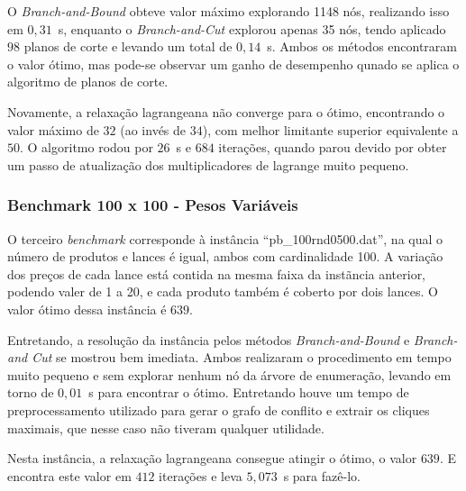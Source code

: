 \documentclass{article}
\begin{document}
    O \emph{Branch-and-Bound} obteve valor máximo explorando 1148 nós, realizando isso em $0{,}31$~s, enquanto o \emph{Branch-and-Cut} explorou apenas 35 nós, tendo aplicado $98$ planos de corte e levando um total de $0{,}14$~s. Ambos os métodos encontraram o valor ótimo, mas pode-se observar um ganho de desempenho qunado se aplica o algoritmo de planos de corte.
    
    Novamente, a relaxação lagrangeana não converge para o ótimo, encontrando o valor máximo de $32$ (ao invés de $34$), com melhor limitante superior equivalente a $50$. O algoritmo rodou por $26$~s e $684$ iterações, quando parou devido por obter um passo de atualização dos multiplicadores de lagrange muito pequeno.
    
    
    \subsubsection{Benchmark 100 x 100 - Pesos Variáveis}
    O terceiro \emph{benchmark} corresponde à instância \enquote{pb\_100rnd0500.dat}, na qual o número de produtos e lances é igual, ambos com cardinalidade 100. A variação dos preços de cada lance está contida na mesma faixa da instãncia anterior, podendo valer de 1 a 20, e cada produto também é coberto por dois lances. O valor ótimo dessa instância é $639$.
    
    
    Entretando, a resolução da instância pelos métodos \emph{Branch-and-Bound} e \emph{Branch-and Cut} se mostrou bem imediata. Ambos realizaram o procedimento em tempo muito pequeno e sem explorar nenhum nó da árvore de enumeração, levando em torno de $ 0{,}01 $~s para encontrar o ótimo. Entretando houve um tempo de preprocessamento utilizado para gerar o grafo de conflito e extrair os cliques maximais, que nesse caso não tiveram qualquer utilidade.
    
    
    Nesta instância, a relaxação lagrangeana consegue atingir o ótimo, o valor $639$. E encontra este valor em $412$ iterações e leva $ 5{,}073 $~s para fazê-lo.
    
\end{document}

